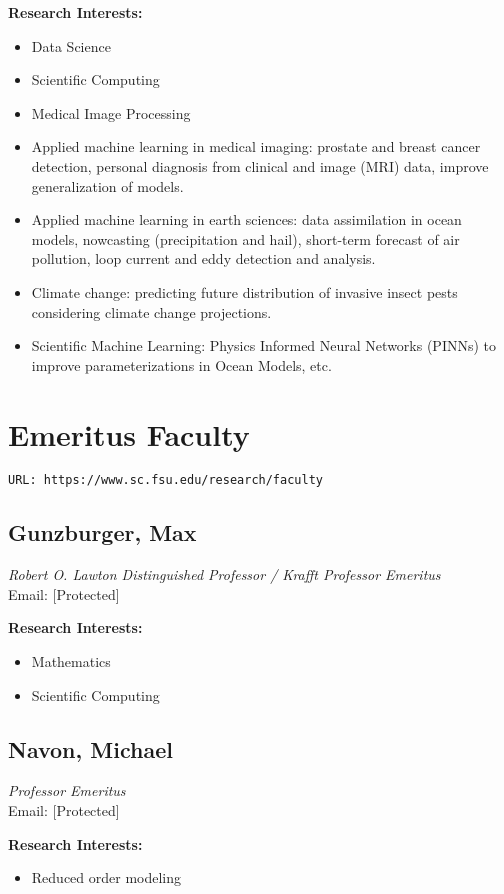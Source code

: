 \documentclass[12pt,a4paper]{article}
\begin{document}
\textbf{Research Interests:}
\begin{itemize}
    \item Data Science
    \item Scientific Computing
    \item Medical Image Processing
    \item Applied machine learning in medical imaging: prostate and breast cancer detection, personal diagnosis from clinical and image (MRI) data, improve generalization of models.
    \item Applied machine learning in earth sciences: data assimilation in ocean models, nowcasting (precipitation and hail), short-term forecast of air pollution, loop current and eddy detection and analysis.
    \item Climate change: predicting future distribution of invasive insect pests considering climate change projections.
    \item Scientific Machine Learning: Physics Informed Neural Networks (PINNs) to improve parameterizations in Ocean Models, etc.
\end{itemize}

\section{Emeritus Faculty}
\texttt{URL: https://www.sc.fsu.edu/research/faculty}

\subsection{Gunzburger, Max}
\textit{Robert O. Lawton Distinguished Professor / Krafft Professor Emeritus} \\
Email: [Protected]

\textbf{Research Interests:}
\begin{itemize}
    \item Mathematics
    \item Scientific Computing
\end{itemize}

\subsection{Navon, Michael}
\textit{Professor Emeritus} \\
Email: [Protected]

\textbf{Research Interests:}
\begin{itemize}
    \item Reduced order modeling
\end{itemize}
\end{document}
